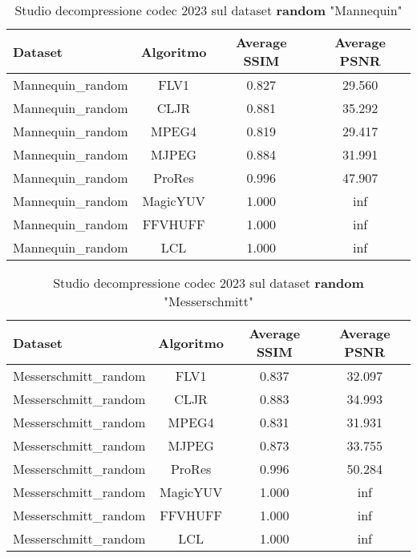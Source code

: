 \begin{table}[!ht]
\centering
\begin{tabular}{|l|c|c|c|}
\hline
Dataset               & Algoritmo & Average SSIM & Average PSNR
\\ \hline
Mannequin\_random     & FLV1      & 0.827        & 29.560       \\ \hline
Mannequin\_random     & CLJR      & 0.881        & 35.292       \\ \hline
Mannequin\_random     & MPEG4     & 0.819        & 29.417       \\ \hline
Mannequin\_random     & MJPEG     & 0.884        & 31.991       \\ \hline
Mannequin\_random     & ProRes    & 0.996        & 47.907       \\ \hline
Mannequin\_random     & MagicYUV  & 1.000        & inf          \\ \hline
Mannequin\_random     & FFVHUFF   & 1.000        & inf          \\ \hline
Mannequin\_random     & LCL       & 1.000        & inf          \\ \hline
\end{tabular}
\caption{Studio decompressione codec 2023 sul dataset \textbf{random} "Mannequin"}
\end{table}

\begin{table}[!ht]
\centering
\begin{tabular}{|l|c|c|c|}
\hline
Dataset               & Algoritmo & Average SSIM & Average PSNR
\\ \hline
Messerschmitt\_random & FLV1      & 0.837        & 32.097       \\ \hline
Messerschmitt\_random & CLJR      & 0.883        & 34.993       \\ \hline
Messerschmitt\_random & MPEG4     & 0.831        & 31.931       \\ \hline
Messerschmitt\_random & MJPEG     & 0.873        & 33.755       \\ \hline
Messerschmitt\_random & ProRes    & 0.996        & 50.284       \\ \hline
Messerschmitt\_random & MagicYUV  & 1.000        & inf          \\ \hline
Messerschmitt\_random & FFVHUFF   & 1.000        & inf          \\ \hline
Messerschmitt\_random & LCL       & 1.000        & inf          \\ \hline
\end{tabular}
\caption{Studio decompressione codec 2023 sul dataset \textbf{random} "Messerschmitt"}
\end{table}

